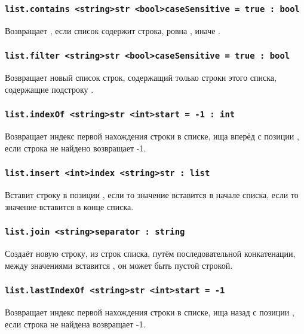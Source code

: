 \documentclass[a4paper, 14pt]{extarticle}
\begin{document}
\subsubsection{\lstinline|list.contains <string>str <bool>caseSensitive = true : bool|}

Возвращает \true, если список содержит строка, ровна , иначе \false.

\subsubsection{\lstinline|list.filter <string>str <bool>caseSensitive = true : bool|}

Возвращает новый список строк, содержащий только строки этого списка, содержащие подстроку . 

\subsubsection{\lstinline|list.indexOf <string>str <int>start = -1 : int|}

Возвращает индекс первой нахождения строки  в списке, ища вперёд с позиции , если строка не найдено возвращает -1.

\subsubsection{\lstinline|list.insert <int>index <string>str : list|}

Вставит строку  в позиции , если  то значение вставится в начале списка, если  то значение вставится в конце списка.

\subsubsection{\lstinline|list.join <string>separator : string|}

Создаёт новую строку, из строк списка, путём последовательной конкатенации, между значениями вставится , он может быть пустой строкой.

\subsubsection{\lstinline|list.lastIndexOf <string>str <int>start = -1|}

Возвращает индекс первой нахождения строки  в списке, ища назад с позиции , если строка не найдена возвращает -1.
\end{document}
